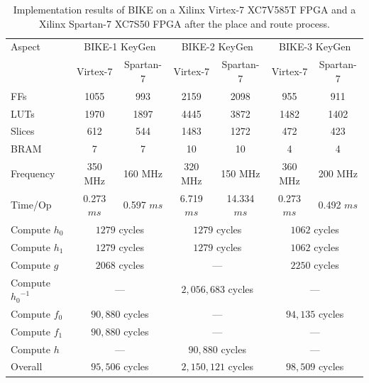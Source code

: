 \documentclass[runningheads]{llncs}
\begin{document}
\begin{table}[!t]\centering
 \caption{Implementation results of BIKE on a Xilinx Virtex-7 XC7V585T FPGA and a Xilinx Spartan-7 XC7S50 FPGA after the place and route process.}
 \label{table:expresult}\centering
 \begin{minipage}{\textwidth}\centering
  \begin{tabular}{lcccccc}
   \hline
   Aspect & \multicolumn{2}{c}{BIKE-1 KeyGen} & \multicolumn{2}{c}{BIKE-2 KeyGen} & \multicolumn{2}{c}{BIKE-3 KeyGen}\\
    & Virtex-7 & Spartan-7  & Virtex-7 & Spartan-7  & Virtex-7 & Spartan-7\\
   \hline
   FFs &1055   &993  &2159 &2098 &955 &911\\
   LUTs & 1970  &1897  &4445 &3872&1482&1402  \\
   Slices& 612 &544  &1483 &1272&472&423  \\
   BRAM & 7  &7  &10 & 10& 4&4\\
   \hline
   Frequency &  350 MHz  & 160 MHz &320 MHz & 150 MHz  & 360 MHz & 200 MHz\\
   Time/Op &  0.273 $ms$ &  0.597 $ms$ & 6.719 $ms$& 14.334 $ms$ &0.273 $ms$  & 0.492 $ms$\\
   \hline
   Compute $h_0$ & \multicolumn{2}{c}{$1279$ cycles} & \multicolumn{2}{c}{$1279$ cycles}  & \multicolumn{2}{c}{$1062$ cycles}\\
   Compute $h_1$& \multicolumn{2}{c}{$1279$ cycles} & \multicolumn{2}{c}{$1279$ cycles} & \multicolumn{2}{c}{$1062$ cycles}\\
   Compute $g$ & \multicolumn{2}{c}{$2068$ cycles} & \multicolumn{2}{c}{---} & \multicolumn{2}{c}{$2250$ cycles}\\
   Compute ${h_0}^{-1}$ & \multicolumn{2}{c}{---} & \multicolumn{2}{c}{$2,056,683$ cycles} &\multicolumn{2}{c}{---}\\
   Compute $f_0$ & \multicolumn{2}{c}{$90,880$ cycles} & \multicolumn{2}{c}{---} &\multicolumn{2}{c}{$94,135$ cycles}\\
   Compute $f_1$ & \multicolumn{2}{c}{$90,880$ cycles}  & \multicolumn{2}{c}{---} &\multicolumn{2}{c}{---}\\
   Compute $h$  &  \multicolumn{2}{c}{---}          & \multicolumn{2}{c}{$90,880$ cycles} & \multicolumn{2}{c}{---}\\
   \hline
   Overall & \multicolumn{2}{c}{$95,506$ cycles} & \multicolumn{2}{c}{$2,150,121$ cycles} & \multicolumn{2}{c}{$98,509$ cycles}\\
   \hline
  \end{tabular}
  \end{minipage}
\end{table}
\end{document}
